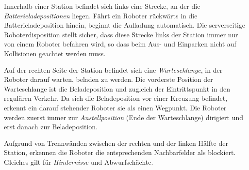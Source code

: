 Innerhalb einer Station befindet sich links eine Strecke, an der die \emph{Batterieladepositionen} liegen. 
Fährt ein Roboter rückwärts in die Batterieladeposition hinein, beginnt die Aufladung automatisch. 
Die serverseitige Roboterdisposition stellt sicher, dass diese Strecke links der Station immer nur von einem Roboter befahren wird, so dass beim Aus- und Einparken nicht auf Kollisionen geachtet werden muss.

Auf der rechten Seite der Station befindet sich eine \emph{Warteschlange}, in der Roboter darauf warten, beladen zu werden. 
Die vorderste Position der Warteschlange ist die Beladeposition und zugleich der Eintrittspunkt in den regulären Verkehr. 
Da sich die Beladeposition vor einer Kreuzung befindet, erkennt ein darauf stehender Roboter sie als einen Wegpunkt. 
Die Roboter werden zuerst immer zur \emph{Anstellposition} (Ende der Warteschlange) dirigiert und erst danach zur Beladeposition.

Aufgrund von Trennwänden zwischen der rechten und der linken Hälfte der Station, erkennen die Roboter die entsprechenden Nachbarfelder als blockiert. 
Gleiches gilt für \emph{Hindernisse} und Abwurfschächte.

